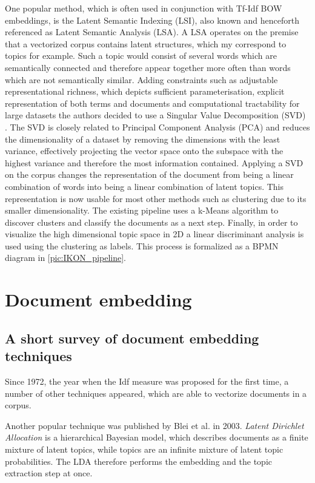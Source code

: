 One popular method, which is often used in conjunction with Tf-Idf BOW embeddings, is the Latent Semantic Indexing (LSI), also known and henceforth referenced as Latent Semantic Analysis (LSA). A LSA operates on the premise that a vectorized corpus contains latent structures, which my correspond to topics for example. Such a topic would consist of several words which are semantically connected and therefore appear together more often than words which are not semantically similar. Adding constraints such as adjustable representational richness, which depicts sufficient parameterisation, explicit representation of both terms and documents and computational tractability for large datasets the authors decided to use a Singular Value Decomposition (SVD) \cite{deerwesterIndexingLatentSemantic}. The SVD is closely related to Principal Component Analysis (PCA) and reduces the dimensionality of a dataset by removing the dimensions with the least variance, effectively projecting the vector space onto the subspace with the highest variance and therefore the most information contained. Applying a SVD on the corpus changes the representation of the document from being a linear combination of words into being a linear combination of latent topics. This representation is now usable for most other methods such as clustering due to its smaller dimensionality. The existing pipeline uses a k-Means algorithm to discover clusters and classify the documents as a next step. Finally, in order to visualize the high dimensional topic space in 2D a linear discriminant analysis is used using the clustering as labels. This process is formalized as a BPMN diagram in \autoref{pic:IKON_pipeline}.


\section{Document embedding}

\subsection{A short survey of document embedding techniques}
Since 1972, the year when the Idf measure was proposed for the first time, \cite{robertsonUnderstandingInverseDocument2004} a number of other techniques appeared, which are able to vectorize documents in a corpus.

Another popular technique was published by Blei et al. \cite{bleiLatentDirichletAllocation2003} in 2003. \textit{Latent Dirichlet Allocation} is a hierarchical Bayesian model, which describes documents as a finite mixture of latent topics, while topics are an infinite mixture of latent topic probabilities. The LDA therefore performs the embedding and the topic extraction step at once.

